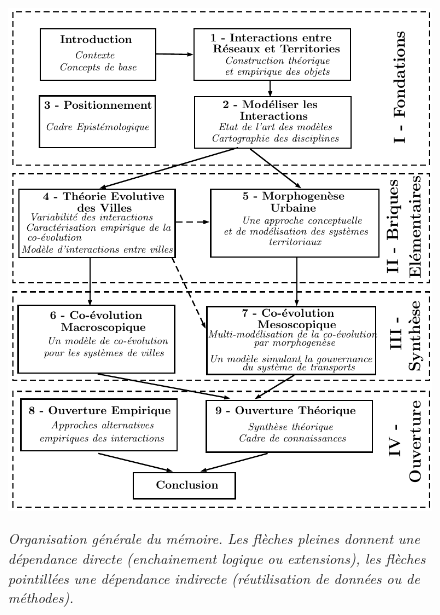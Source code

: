 \begin{figure}[h!]
	\begin{mdframed}
		
		\includegraphics[width=\linewidth]{Figures/Theory/plan.pdf}
		
		\medskip
		
		 \textit{Organisation générale du mémoire. Les flèches pleines donnent une dépendance directe (enchainement logique ou extensions), les flèches pointillées une dépendance indirecte (réutilisation de données ou de méthodes).}
		
	\end{mdframed}
\end{figure}









